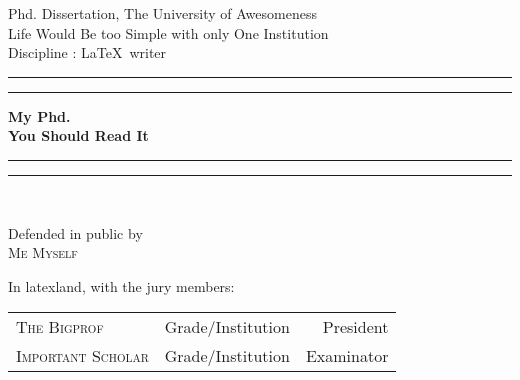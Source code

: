 

\pagestyle{empty}



\vfill
\noindent
\begin{center}
    \Large
Phd. Dissertation,  The University of Awesomeness \\
Life Would Be too Simple with only One Institution \\
Discipline : \LaTeX\ writer \\
\end{center}

\vfill

\noindent\rule{\textwidth}{1.6pt}\vspace*{-\baselineskip}\vspace*{2pt} %
\rule{\textwidth}{0.4pt} %

\begin{center}
    \Huge\bfseries
    My Phd. \\ You Should Read It
\end{center}

\noindent\rule{\textwidth}{0.4pt}\vspace*{-\baselineskip}\vspace{3.2pt} %
\rule{\textwidth}{1.6pt}\\[\baselineskip] %

\begin{center}
\Large
Defended in public by \\
\huge
\textsc{Me Myself}
\end{center}
\vfill
\begin{center}
	\Large\noindent 
    In latexland, with the jury members:\\
    \vfill
    \begin{tabular}{lcr}
    \textsc{The Bigprof} & Grade/Institution & President \\
    \textsc{Important Scholar} & Grade/Institution & Examinator \\
    \end{tabular}       
\end{center}

